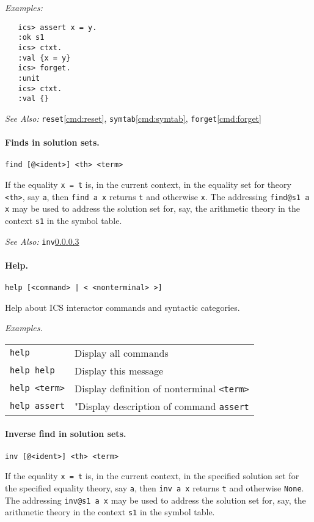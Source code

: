\documentclass[12pt]{article}
\begin{document}
\noindent
{\em Examples:}
  \begin{verbatim}
   ics> assert x = y.
   :ok s1
   ics> ctxt. 
   :val {x = y}
   ics> forget.
   :unit
   ics> ctxt.
   :val {}
  \end{verbatim}

\noindent
{\em See Also:} 
   \texttt{reset}\ref{cmd:reset}, 
   \texttt{symtab}\ref{cmd:symtab},
   \texttt{forget}\ref{cmd:forget}

\paragraph{Finds in solution sets.}\label{cmd:find}
  \begin{center}
  \texttt{find [@<ident>] <th> <term>}
  \end{center}
If the equality \texttt{x = t} is, in the current context, in the equality set 
for theory {\tt <th>}, say \texttt{a}, then \texttt{find a x} returns \texttt{t} 
and otherwise \texttt{x}\@. The addressing \texttt{find@s1 a x} may
be used to address the solution set for, say, the arithmetic theory in the 
context \texttt{s1} in the symbol table.

\noindent
{\em See Also:} \texttt{inv}\ref{cmd:inv} 


\paragraph{Help.}\label{cmd:help}
  \begin{center}
  \texttt{help [<command> | < <nonterminal> >]}
  \end{center}
Help about ICS interactor commands and syntactic categories.

\noindent
{\em Examples.}\\
  \begin{tabular}{ll}
  \texttt{help}        & Display all commands \\
  \texttt{help help}   &  Display this message \\
  \texttt{help <term>} &  Display definition of nonterminal \texttt{<term>} \\
  \texttt{help assert} & "Display description of command \texttt{assert}  \\
  \end{tabular}


\paragraph{Inverse find in solution sets.}\label{cmd:inv}
  \begin{center}
  \texttt{inv [@<ident>] <th> <term>}
  \end{center}
If the equality \texttt{x = t} is, in the current context, in the specified solution set for the 
specified equality theory, say \texttt{a}, then \texttt{inv a x} returns \texttt{t} and 
otherwise \texttt{None}\@. The addressing \texttt{inv@s1 a x} may be used to address the 
solution set for, say, the arithmetic theory in the context \texttt{s1} in the symbol table.
\end{document}
